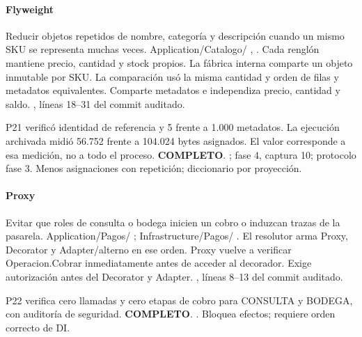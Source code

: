 \paragraph{Flyweight}
 Reducir objetos repetidos de nombre, categoría y descripción cuando un mismo SKU se representa muchas veces.
 Application/Catalogo/ , . Cada renglón mantiene precio, cantidad y stock propios. La fábrica interna comparte un objeto inmutable por SKU. La comparación usó la misma cantidad y orden de filas y metadatos equivalentes.
 Comparte metadatos e independiza precio, cantidad y saldo.
 , líneas 18--31 del commit auditado.

 P21 verificó identidad de referencia y 5 frente a 1.000 metadatos. La ejecución archivada midió 56.752 frente a 104.024 bytes asignados. El valor corresponde a esa medición, no a todo el proceso. \textbf{COMPLETO}.
 ; fase 4, captura 10; protocolo fase 3.
 Menos asignaciones con repetición; diccionario por proyección.
\medskip
\clearpage
\paragraph{Proxy}
 Evitar que roles de consulta o bodega inicien un cobro o induzcan trazas de la pasarela.
 Application/Pagos/ ; Infrastructure/Pagos/ . El resolutor arma Proxy, Decorator y Adapter/alterno en ese orden. Proxy vuelve a verificar Operacion.Cobrar inmediatamente antes de acceder al decorador.
 Exige autorización antes del Decorator y Adapter.
 , líneas 8--13 del commit auditado.

 P22 verifica cero llamadas y cero etapas de cobro para CONSULTA y BODEGA, con auditoría de seguridad. \textbf{COMPLETO}.
 .
 Bloquea efectos; requiere orden correcto de DI.
\medskip
\clearpage
